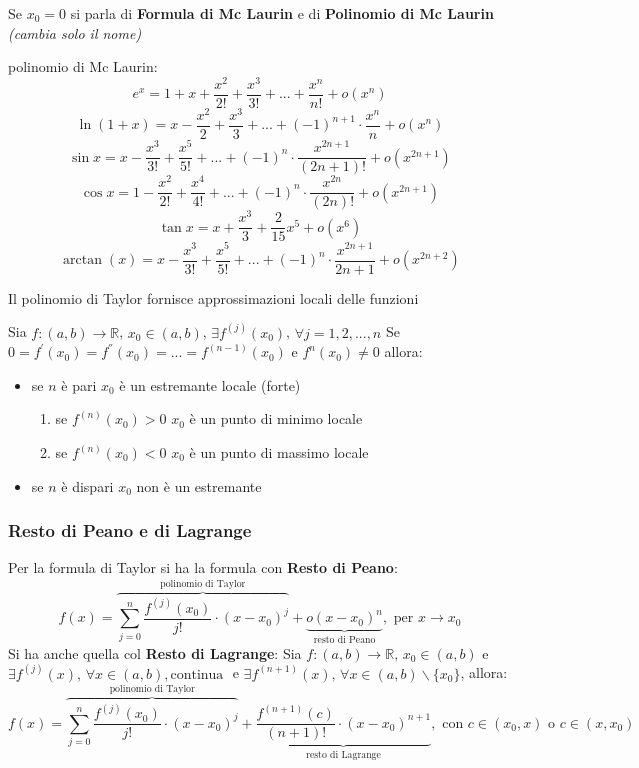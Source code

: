 \documentclass[a4paper,12pt, oneside]{book}
\begin{document}
\begin{teorema} Se $x_0=0$ si parla di \textbf{Formula di
    Mc Laurin} e di \textbf{Polinomio di Mc Laurin} \textit{(cambia solo il nome)}
\end{teorema}
\newpage
\begin{shaded} %
  polinomio di Mc Laurin:
  $$e^{x}=1+x+\frac{x^2}{2!}+\frac{x^3}{3!}+...+\frac{x^n}{n!}+o(x^n)$$
  $$\ln(1+x)=x-\frac{x^2}{2}+\frac{x^3}{3}+...+(-1)^{n+1}\cdot\frac{x^n}{n}+o(x^n)$$
  $$\sin x=x-\frac{x^3}{3!}+\frac{x^5}{5!}+...+(-1)^{n}\cdot\frac{x^{2n+1}}{(2n+1)!}+o(x^{2n+1})$$
  $$\cos x=1-\frac{x^2}{2!}+\frac{x^4}{4!}+...+(-1)^{n}\cdot\frac{x^{2n}}{(2n)!}+o(x^{2n+1})$$
  $$\tan x=x+\frac{x^3}{3}+\frac{2}{15}x^5+o(x^6)$$
  $$\arctan(x)=x-\frac{x^3}{3!}+\frac{x^5}{5!}+...+(-1)^{n}\cdot\frac{x^{2n+1}}{2n+1}+o(x^{2n+2})$$
\end{shaded}
\begin{nota} Il polinomio di Taylor fornisce approssimazioni locali delle
  funzioni
\end{nota}
\begin{teorema} Sia
  $f:(a,b)\rightarrow\mathbb{R}$, $x_0\in (a,b)$, $\exists f^{(j)}(x_0)$, $
  \forall j=1,2,...,n$ Se $0=f^{'}(x_0)=f^{''}(x_0)=...=f^{(n-1)}(x_0)$ e
  $f^{n}(x_0)\neq 0$ allora:
  \begin{itemize}
    \item se $n$ è pari $x_0$ è un estremante locale (forte)
    \begin{enumerate}
      \item se $f^{(n)}(x_0)>0$ $x_0$ è un punto di minimo locale
      \item se $f^{(n)}(x_0)<0$ $x_0$ è un punto di massimo locale
    \end{enumerate}
    \item se $n$ è dispari $x_0$ non è un estremante
  \end{itemize}
\end{teorema}
\subsubsection{Resto di Peano e di Lagrange} Per la formula di Taylor si ha la
formula con \textbf{Resto di Peano}:
$$f(x)=\overbrace{\sum_{j=0}^{n} \frac{f^{(j)}(x_0)}{j!}\cdot {(x-x_0)}^j}^{\mbox{polinomio di Taylor}}+\underbrace{o(x-x_0)^n}_{\mbox{resto di Peano}}, \mbox{ per } x\rightarrow x_0$$
Si ha anche quella col \textbf{Resto di Lagrange}: Sia $f:(a,b)\rightarrow
\mathbb{R},\, x_0\in (a,b)$ e $\exists f^{(j)}(x),\, \forall x\in (a,b), \mbox{
  continua }$ e $\exists f^{(n+1)}(x),\, \forall x\in(a,b)\backslash \{x_0\}$,
allora:
$$f(x)=\overbrace{\sum_{j=0}^{n} \frac{f^{(j)}(x_0)}{j!}\cdot {(x-x_0)}^j}^{\mbox{polinomio di Taylor}}+\underbrace{\frac{f^{(n+1)}(c)}{(n+1)!}\cdot(x-x_0)^{n+1}}_{\mbox{resto di Lagrange}},\mbox{ con } c\in(x_0,x) \mbox{ o } c\in (x,x_0)$$
\end{document}
